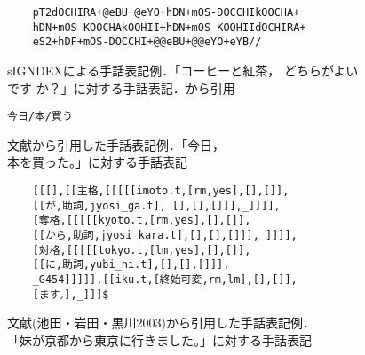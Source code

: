 \begin{figure}[tb]
  \centering
  \begin{minipage}{.65\linewidth}
    \begin{screen}[4]
      \small
      \setlength{\baselineskip}{12pt}
\begin{verbatim}
    pT2dOCHIRA+@eBU+@eYO+hDN+mOS-DOCCHIkOOCHA+
    hDN+mOS-KOOCHAkOOHII+hDN+mOS-KOOHIIdOCHIRA+
    eS2+hDF+mOS-DOCCHI+@@eBU+@@eYO+eYB//
\end{verbatim}
    \end{screen}
  \end{minipage}
  \caption{sIGNDEXによる手話表記例．「コーヒーと紅茶，
    どちらがよい\\です
    か？」に対する手話表記．\cite{Ichikawa2001}から引用}
  \label{fig:signdex}

  \vspace*{2ex}

  \begin{minipage}{.65\linewidth}
    \small
  \begin{screen}[4]
\tt\hfil 今日/本/買う
  \end{screen}
  \end{minipage}
  \caption{文献\cite{Tokuda1998}から引用した手話表記例．「今日，\\
本を買った。」に対する手話表記}
  \label{fig:tokuda}

  \vspace*{2ex}

  \begin{minipage}{.65\linewidth}
  \begin{screen}[4]
    \small
    \setlength{\baselineskip}{12pt}
\begin{verbatim}
    [[[],[[主格,[[[[[imoto.t,[rm,yes],[],[]],
    [[が,助詞,jyosi_ga.t], [],[],[]]],_]]]],
    [奪格,[[[[[kyoto.t,[rm,yes],[],[]],
    [[から,助詞,jyosi_kara.t],[],[],[]]],_]]]],
    [対格,[[[[[tokyo.t,[lm,yes],[],[]],
    [[に,助詞,yubi_ni.t],[],[],[]]],
    _G454]]]]],[[iku.t,[終始可変,rm,lm],[],[]],
    [ます。],_]]]$
\end{verbatim}
  \end{screen}
  \end{minipage}
  \caption{文献(池田・岩田・黒川2003)から引用した手話表記例．\\
    「妹が京都から東京に行きました。」に対する手話表記}
  \label{fig:ikeda}
\end{figure}

